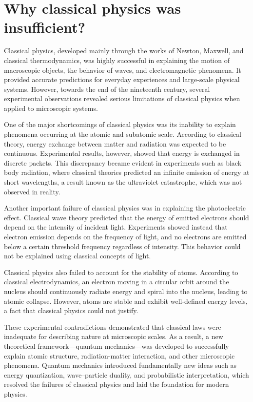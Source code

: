 \documentclass[17pt,a4paper]{extarticle}
\begin{document}
\section*{Why classical physics was insufficient?}

Classical physics, developed mainly through the works of Newton, Maxwell, and classical thermodynamics, was highly successful in explaining the motion of macroscopic objects, the behavior of waves, and electromagnetic phenomena. It provided accurate predictions for everyday experiences and large-scale physical systems. However, towards the end of the nineteenth century, several experimental observations revealed serious limitations of classical physics when applied to microscopic systems.

One of the major shortcomings of classical physics was its inability to explain phenomena occurring at the atomic and subatomic scale. According to classical theory, energy exchange between matter and radiation was expected to be continuous. Experimental results, however, showed that energy is exchanged in discrete packets. This discrepancy became evident in experiments such as black body radiation, where classical theories predicted an infinite emission of energy at short wavelengths, a result known as the ultraviolet catastrophe, which was not observed in reality.

Another important failure of classical physics was in explaining the photoelectric effect. Classical wave theory predicted that the energy of emitted electrons should depend on the intensity of incident light. Experiments showed instead that electron emission depends on the frequency of light, and no electrons are emitted below a certain threshold frequency regardless of intensity. This behavior could not be explained using classical concepts of light.

Classical physics also failed to account for the stability of atoms. According to classical electrodynamics, an electron moving in a circular orbit around the nucleus should continuously radiate energy and spiral into the nucleus, leading to atomic collapse. However, atoms are stable and exhibit well-defined energy levels, a fact that classical physics could not justify.

These experimental contradictions demonstrated that classical laws were inadequate for describing nature at microscopic scales. As a result, a new theoretical framework—quantum mechanics—was developed to successfully explain atomic structure, radiation-matter interaction, and other microscopic phenomena. Quantum mechanics introduced fundamentally new ideas such as energy quantization, wave–particle duality, and probabilistic interpretation, which resolved the failures of classical physics and laid the foundation for modern physics.
\end{document}
